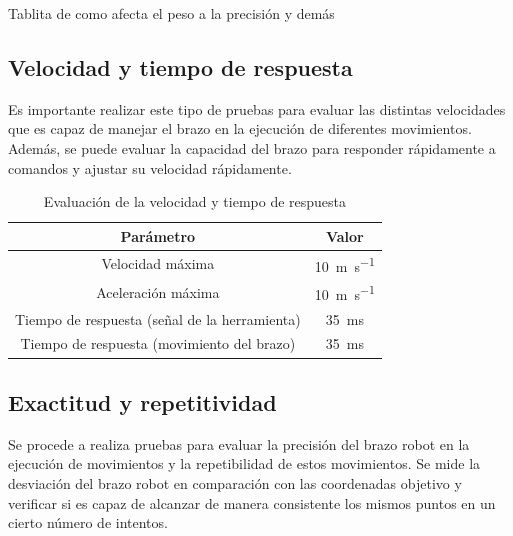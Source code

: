Tablita de como afecta el peso a la precisión y demás

\subsection{Velocidad y tiempo de respuesta}
Es importante realizar este tipo de pruebas para evaluar las distintas velocidades que es capaz de manejar el brazo en la ejecución 
de diferentes movimientos. Además, se puede evaluar la capacidad del brazo para responder rápidamente a comandos y ajustar su 
velocidad rápidamente.

\begin{table}[H]
\begin{center}
\begin{tabular}{|c|c|}
\hline
\textbf{Parámetro} & \textbf{Valor} \\
\hline
Velocidad máxima & \SI{10}{\meter\per\second}\\
Aceleración máxima & \SI{10}{\meter\per\second}\\
Tiempo de respuesta (señal de la herramienta) & \SI{35}{\milli\second} \\
Tiempo de respuesta (movimiento del brazo) & \SI{35}{\milli\second} \\
\hline
\end{tabular}
\caption{Evaluación de la velocidad y tiempo de respuesta}
\label{cuadro:evaluacion_velocidad}
\end{center}
\end{table}

\subsection{Exactitud y repetitividad} 
Se procede a realiza pruebas para evaluar la precisión del brazo robot en la ejecución de movimientos y la repetibilidad 
de estos movimientos. Se mide la desviación del brazo robot en comparación con las coordenadas objetivo y verificar si 
es capaz de alcanzar de manera consistente los mismos puntos en un cierto número de intentos.


